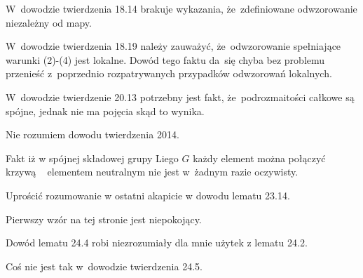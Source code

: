 \documentclass[a4paper,11pt]{article}
\begin{document}
\vspace{\spaceFour}



\start {} W~dowodzie twierdzenia 18.14 brakuje wykazania,
że~zdefiniowane odwzorowanie niezależny od mapy.

\vspace{\spaceFour}



\start {} W~dowodzie twierdzenia 18.19 należy zauważyć,
że~odwzorowanie spełniające warunki (2)-(4) jest lokalne. Dowód tego
faktu da~się chyba bez problemu przenieść z~poprzednio rozpatrywanych
przypadków odwzorowań lokalnych.

\vspace{\spaceFour}



\start {} W~dowodzie twierdzenie 20.13 potrzebny jest fakt,
że~podrozmaitości całkowe są spójne, jednak nie ma pojęcia skąd to
wynika.

\vspace{\spaceFour}



\start {} Nie rozumiem dowodu twierdzenia 2014.

\vspace{\spaceFour}



\start {} Fakt iż w spójnej składowej grupy Liego $G$ każdy
element można połączyć krzywą ~ elementem neutralnym nie jest w~żadnym
razie oczywisty.

\vspace{\spaceFour}



\start {} Uprościć rozumowanie w ostatni akapicie w dowodu
lematu 23.14.

\vspace{\spaceFour}



\start {} Pierwszy wzór na tej stronie jest niepokojący.

\vspace{\spaceFour}



\start {} Dowód lematu 24.4 robi niezrozumiały dla mnie użytek
z lematu 24.2.

\vspace{\spaceFour}



\start {} Coś nie jest tak w~dowodzie twierdzenia 24.5.
\end{document}
